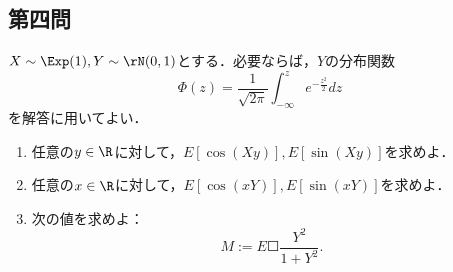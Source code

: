 \documentclass[uplatex,dvipdfmx]{jsarticle}
\begin{document}
\subsection{第四問}

\begin{tcolorbox}[colframe=ForestGreen, colback=ForestGreen!10!white,breakable,colbacktitle=ForestGreen!40!white,coltitle=black,fonttitle=\bfseries\sffamily,
    title=第４問]
    \begin{problem}\label{prob-23-1-4}
        $X\sim\Exp(1),Y\sim\rN(0,1)$とする．必要ならば，$Y$の分布関数
        \[\Phi(z)=\frac{1}{\sqrt{2\pi}}\int^z_{-\infty}e^{-\frac{z^2}{2}}dz\]
        を解答に用いてよい．
        \begin{enumerate}[{問}1]
            \item 任意の$y\in\R$に対して，$E[\cos(Xy)],E[\sin(Xy)]$を求めよ．
            \item 任意の$x\in\R$に対して，$E[\cos(xY)],E[\sin(xY)]$を求めよ．
            \item 次の値を求めよ：
            \[M:=E\Square{\frac{Y^2}{1+Y^2}}.\]
        \end{enumerate}
    \end{problem}
\end{tcolorbox}
\end{document}
